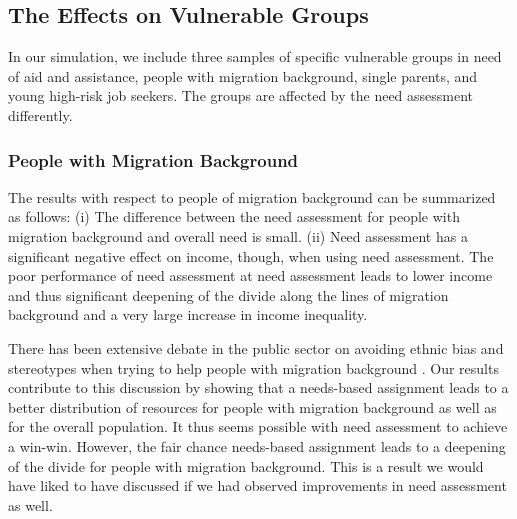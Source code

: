 \documentclass{article} %
\begin{document}
\subsection{The Effects on Vulnerable Groups}
\label{sec:results_groups}
In our simulation, we include three samples of specific vulnerable groups in need of aid and assistance, people with migration background, single parents, and young high-risk job seekers. The groups are affected by the need assessment differently.

\subsubsection{People with Migration Background}
\label{sec:results_migration}
\begin{table}[!ht]
\centering
\label{tab:migration}
\end{table}
The results with respect to people of migration background can be summarized as follows: (i) The difference between the need assessment for people with migration background and overall need is small. (ii) Need assessment has a significant negative effect on income, though, when using need assessment. The poor performance of need assessment at need assessment leads to lower income and thus significant deepening of the divide along the lines of migration background and a very large increase in income inequality.

There has been extensive debate in the public sector on avoiding ethnic bias and stereotypes when trying to help people with migration background \cite{ desiere2019statistical}. Our results contribute to this discussion by showing that a needs-based assignment leads to a better distribution of resources for people with migration background as well as for the overall population. It thus seems possible with need assessment to achieve a win-win. However, the fair chance needs-based assignment leads to a deepening of the divide for people with migration background. This is a result we would have liked to have discussed if we had observed improvements in need assessment as well. 
\end{document}
